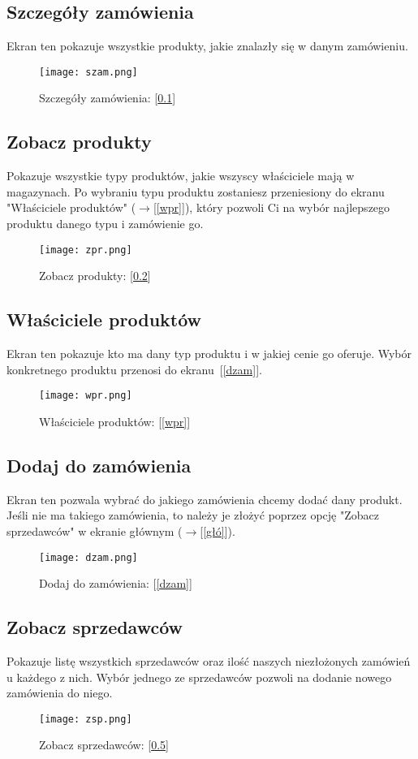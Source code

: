 \subsection{Szczegóły zamówienia}
\label{szam}
Ekran ten pokazuje wszystkie produkty, jakie znalazły się w danym zamówieniu.
\begin{figure}
  \centering
  \texttt{[image: szam.png]}
  \caption{Szczegóły zamówienia: [\ref{szam}]}
  \label{szamI}
\end{figure}
\subsection{Zobacz produkty}
\label{zpr}
Pokazuje wszystkie typy produktów, jakie wszyscy właściciele mają w magazynach. Po wybraniu typu produktu zostaniesz przeniesiony do ekranu "Właściciele produktów" ($\rightarrow$[\ref{wpr}]), który pozwoli Ci na wybór najlepszego produktu danego typu i zamówienie go.
\begin{figure}
  \centering
  \texttt{[image: zpr.png]}
  \caption{Zobacz produkty: [\ref{zpr}]}
  \label{zprI}
\end{figure}
\subsection{Właściciele produktów}
Ekran ten pokazuje kto ma dany typ produktu i w jakiej cenie go oferuje. Wybór konkretnego produktu przenosi do ekranu~[\ref{dzam}].
\label{wpr}
\begin{figure}
  \centering
  \texttt{[image: wpr.png]}
  \caption{Właściciele produktów: [\ref{wpr}]}
  \label{wprI}
\end{figure}
\subsection{Dodaj do zamówienia}
Ekran ten pozwala wybrać do jakiego zamówienia chcemy dodać dany produkt. Jeśli nie ma takiego zamówienia, to należy je złożyć poprzez opcję "Zobacz sprzedawców" w ekranie głównym ($\rightarrow$[\ref{głó}]).
\label{dzam}
\begin{figure}
  \centering
  \texttt{[image: dzam.png]}
  \caption{Dodaj do zamówienia: [\ref{dzam}]}
  \label{dzamI}
\end{figure}
\subsection{Zobacz sprzedawców}
\label{zsp}
Pokazuje listę wszystkich sprzedawców oraz ilość naszych niezłożonych zamówień u każdego z nich. Wybór jednego ze sprzedawców pozwoli na dodanie nowego zamówienia do niego.
\begin{figure}
  \centering
  \texttt{[image: zsp.png]}
  \caption{Zobacz sprzedawców: [\ref{zsp}]}
  \label{zspI}
\end{figure}
